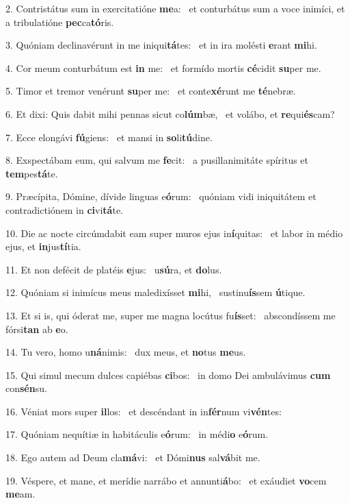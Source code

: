 2. Contristátus sum in exercitatióne \textbf{me}a: \ast\  et conturbátus sum a voce inimíci, et a tribulatióne \textbf{pec}ca\textbf{tó}ris.\

3. Quóniam declinavérunt in me iniqui\textbf{tá}tes: \ast\  et in ira molésti \textbf{e}rant \textbf{mi}hi.\

4. Cor meum conturbátum est \textbf{in} me: \ast\  et formído mortis \textbf{cé}cidit \textbf{su}per me.\

5. Timor et tremor venérunt \textbf{su}per me: \ast\  et conte\textbf{xé}runt me \textbf{té}nebræ.\

6. Et dixi: Quis dabit mihi pennas sicut co\textbf{lúm}bæ, \ast\  et volábo, et \textbf{re}qui\textbf{és}cam?\

7. Ecce elongávi \textbf{fú}giens: \ast\  et mansi in \textbf{so}li\textbf{tú}dine.\

8. Exspectábam eum, qui salvum me \textbf{fe}cit: \ast\  a pusillanimitáte spíritus et \textbf{tem}pes\textbf{tá}te.\

9. Præcípita, Dómine, dívide linguas e\textbf{ó}rum: \ast\  quóniam vidi iniquitátem et contradictiónem in \textbf{ci}vi\textbf{tá}te.\

10. Die ac nocte circúmdabit eam super muros ejus in\textbf{í}quitas: \ast\  et labor in médio ejus, et \textbf{in}jus\textbf{tí}tia.\

11. Et non defécit de platéis \textbf{e}jus: \ast\  u\textbf{sú}ra, et \textbf{do}lus.\

12. Quóniam si inimícus meus maledixísset \textbf{mi}hi, \ast\  sustinu\textbf{ís}sem \textbf{ú}tique.\

13. Et si is, qui óderat me, super me magna locútus fu\textbf{ís}set: \ast\  abscondíssem me fórsi\textbf{tan} ab \textbf{e}o.\

14. Tu vero, homo u\textbf{ná}nimis: \ast\  dux meus, et \textbf{no}tus \textbf{me}us.\

15. Qui simul mecum dulces capiébas \textbf{ci}bos: \ast\  in domo Dei ambulávimus \textbf{cum} con\textbf{sén}su.\

16. Véniat mors super \textbf{il}los: \ast\  et descéndant in in\textbf{fér}num vi\textbf{vén}tes:\

17. Quóniam nequítiæ in habitáculis e\textbf{ó}rum: \ast\  in médi\textbf{o} e\textbf{ó}rum.\

18. Ego autem ad Deum cla\textbf{má}vi: \ast\  et Dómi\textbf{nus} sal\textbf{vá}bit me.\

19. Véspere, et mane, et merídie narrábo et annunti\textbf{á}bo: \ast\  et exáudiet \textbf{vo}cem \textbf{me}am.\

